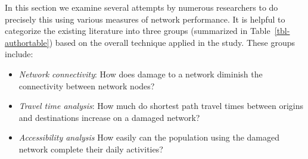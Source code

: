 \documentclass[
  letterpaper,
  number,
  review,
  3p]{elsarticle}
\begin{document}
In this section we examine several attempts by numerous researchers to
do precisely this using various measures of network performance. It is
helpful to categorize the existing literature into three groups
(summarized in Table~\ref{tbl-authortable}) based on the overall
technique applied in the study. These groups include:

\begin{itemize}
\item
  \emph{Network connectivity}: How does damage to a network diminish the
  connectivity between network nodes?
\item
  \emph{Travel time analysis}: How much do shortest path travel times
  between origins and destinations increase on a damaged network?
\item
  \emph{Accessibility analysis} How easily can the population using the
  damaged network complete their daily activities?
\end{itemize}
\end{document}

